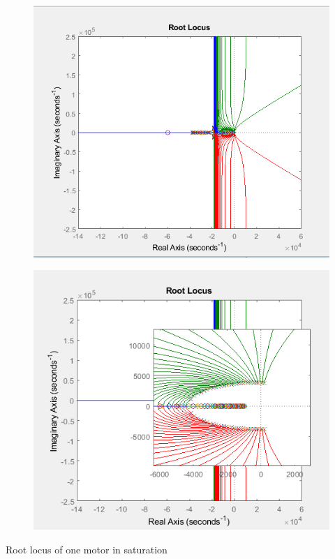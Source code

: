 \begin{table}[H]
	\begin{minipage}[b]{0.49\linewidth}
		\centering
		\begin{figure}[H]
			\centering
			\includegraphics[width=1\linewidth]{figures/pid_saturate3}
		\end{figure}
	\end{minipage}\hfill
	\begin{minipage}[b]{0.49\linewidth}
		\centering
		\begin{figure}[H]
			\centering
			\includegraphics[width=1\linewidth]{figures/pid_saturate2}
		\end{figure}
	\end{minipage}
	\caption{ Root locus of one motor in saturation }
	\label{fig:rlocus44}
\end{table}
